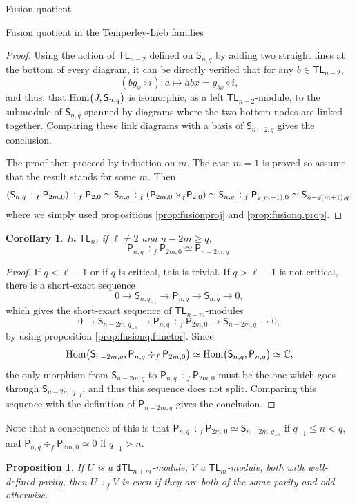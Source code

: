\documentclass[reqno]{amsart}
\newtheorem{Prop}[Thm]{Proposition}
\newtheorem{Coro}[Thm]{Corollary}
\newcommand{\dtl}[1]{\mathsf{dTL}_{#1}}
\newcommand{\tl}[1]{\mathsf{TL}_{#1}}
\newcommand{\ds}[1]{\mathsf S_{#1}}
\newcommand{\dP}[1]{\mathsf P_{#1}}
\newcommand{\xf}{\times\hspace{-0.27em}_f}
\newcommand{\Hom}[1]{\text{\rm{Hom}}\big( #1 \big)}
\begin{document}
\begin{section}{Fusion quotient}
\begin{subsection}{Fusion quotient in the Temperley-Lieb families}
\begin{proof}
Using the action of $\tl{n-2}$ defined on $\ds{n,q}$ by adding two straight lines at the bottom of every diagram, it can be directly verified that for any $b \in \tl{n-2}$, $$(bg_{x} \circ i): a \mapsto abx = g_{bx} \circ i,$$ and thus, that $\Hom{J,\ds{n,q}}$ is isomorphic, as a left $\tl{n-2}$-module, to the submodule of $\ds{n,q}$ spanned by diagrams where the two bottom nodes are linked together. Comparing these link diagrams with a basis of $\ds{n-2,q}$ gives the conclusion.


The proof then proceed by induction on $m$. The case $m=1$ is proved so assume that the result stands for some $m$. Then
\begin{equation}
\left(\ds{n,q}\div_{f} \dP{2m,0} \right)\div_{f} \dP{2,0} \simeq \ds{n,q} \div_{f}\left(\dP{2m,0}\xf\dP{2,0}\right) \simeq \ds{n,q}\div_{f} \dP{2(m+1),0} \simeq \ds{n-2(m+1),q}, 
\end{equation}
where we simply used propositions \ref{prop:fusionproj} and \ref{prop:fusionq.prop}.
\end{proof}
\begin{Coro}\label{coro:fusionq.proj.reg}
In $\tl{n}$, if $\ell \neq 2$ and $n-2m \geq q$,
\begin{equation}
\dP{n,q}\div_{f} \dP{2m,0} \simeq \dP{n-2m,q}.
\end{equation}
\end{Coro}
\begin{proof}
If $q<\ell-1$ or if $q$ is critical, this is trivial. If $q >\ell-1$ is not critical, there is a short-exact sequence
$$0 \longrightarrow \ds{n,q_{-1}} \longrightarrow \dP{n,q} \longrightarrow \ds{n,q} \longrightarrow 0,$$
which gives the short-exact sequence of $\tl{n-m}$-modules $$0 \longrightarrow \ds{n-2m,q_{-1}} \longrightarrow \dP{n,q}\div_{f} \dP{2m,0} \longrightarrow \ds{n-2m,q} \longrightarrow 0,$$ by using proposition \ref{prop:fusionq.functor}. Since $$\Hom{\ds{n-2m,q}, \dP{n,q}\div_{f}\dP{2m,0}} \simeq \Hom{\ds{n,q},\dP{n,q}} \simeq \mathbb{C},$$ the only morphism from $\ds{n-2m,q}$ to $\dP{n,q}\div_{f} \dP{2m,0}$ must be the one which goes through $\ds{n-2m,q_{-1}}$, and thus this sequence does not split. Comparing this sequence with the definition of $\dP{n-2m,q}$ gives the conclusion.
\end{proof}
Note that a consequence of this is that $\dP{n,q}\div_{f} \dP{2m,0} \simeq \ds{n-2m,q_{-1}}$ if $q_{-1}\leq n < q$, and $\dP{n,q}\div_{f} \dP{2m,0} \simeq 0$ if $q_{-1}>n$.
\begin{Prop}
If $U$ is a $\dtl{n+m}$-module, $V$ a $\tl{m}$-module, both with well-defined parity, then $U\div_{f} V$ is even if they are both of the same parity and odd otherwise.

\end{Prop}
\end{subsection}
\end{section}
\end{document}
